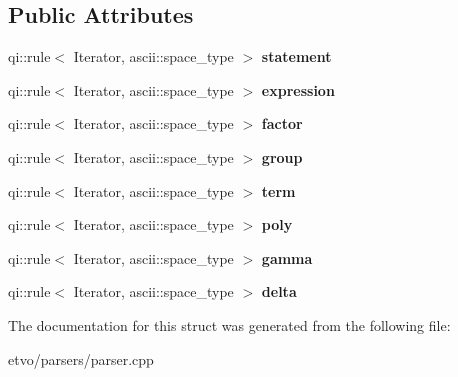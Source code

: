 \subsection*{Public Attributes}
\begin{DoxyCompactItemize}
\item 
\mbox{\label{structparsepoly_i_i_i_1_1calculator_ac4d1630760c1a5dd42530359e7745fac}} 
qi\+::rule$<$ Iterator, ascii\+::space\+\_\+type $>$ {\bfseries statement}
\item 
\mbox{\label{structparsepoly_i_i_i_1_1calculator_acf9256c63c2d22fb796b60546d7afab7}} 
qi\+::rule$<$ Iterator, ascii\+::space\+\_\+type $>$ {\bfseries expression}
\item 
\mbox{\label{structparsepoly_i_i_i_1_1calculator_a0ee412204b1c723e26cf9d4d38ea23f0}} 
qi\+::rule$<$ Iterator, ascii\+::space\+\_\+type $>$ {\bfseries factor}
\item 
\mbox{\label{structparsepoly_i_i_i_1_1calculator_a9094537b17e7894ac0a1f5940a80630a}} 
qi\+::rule$<$ Iterator, ascii\+::space\+\_\+type $>$ {\bfseries group}
\item 
\mbox{\label{structparsepoly_i_i_i_1_1calculator_a71a60be08388b36e22971d47817c3815}} 
qi\+::rule$<$ Iterator, ascii\+::space\+\_\+type $>$ {\bfseries term}
\item 
\mbox{\label{structparsepoly_i_i_i_1_1calculator_ad217b4cf3123379b5ff80f5cacea1422}} 
qi\+::rule$<$ Iterator, ascii\+::space\+\_\+type $>$ {\bfseries poly}
\item 
\mbox{\label{structparsepoly_i_i_i_1_1calculator_a5e97dd49cd73b13c9bd1fe50344a8014}} 
qi\+::rule$<$ Iterator, ascii\+::space\+\_\+type $>$ {\bfseries gamma}
\item 
\mbox{\label{structparsepoly_i_i_i_1_1calculator_a1fb43c883186e7ad87107bfb78029c29}} 
qi\+::rule$<$ Iterator, ascii\+::space\+\_\+type $>$ {\bfseries delta}
\end{DoxyCompactItemize}


The documentation for this struct was generated from the following file\+:\begin{DoxyCompactItemize}
\item 
etvo/parsers/parser.\+cpp\end{DoxyCompactItemize}
